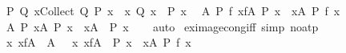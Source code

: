 \begin{isabellebody}
\ \ {\isachardoublequoteopen}{\isasymAnd}P\ Q{\isachardot}{\kern0pt}\ {\isacharparenleft}{\kern0pt}{\isasymexists}x{\isasymin}Collect\ Q{\isachardot}{\kern0pt}\ P\ x{\isacharparenright}{\kern0pt}\ {\isasymlongleftrightarrow}\ {\isacharparenleft}{\kern0pt}{\isasymexists}x{\isachardot}{\kern0pt}\ Q\ x\ {\isasymand}\ P\ x{\isacharparenright}{\kern0pt}{\isachardoublequoteclose}\isanewline
\ \ {\isachardoublequoteopen}{\isasymAnd}A\ P\ f{\isachardot}{\kern0pt}\ {\isacharparenleft}{\kern0pt}{\isasymexists}x{\isasymin}f{\isacharbackquote}{\kern0pt}A{\isachardot}{\kern0pt}\ P\ x{\isacharparenright}{\kern0pt}\ {\isasymlongleftrightarrow}\ {\isacharparenleft}{\kern0pt}{\isasymexists}x{\isasymin}A{\isachardot}{\kern0pt}\ P\ {\isacharparenleft}{\kern0pt}f\ x{\isacharparenright}{\kern0pt}{\isacharparenright}{\kern0pt}{\isachardoublequoteclose}\isanewline
\ \ {\isachardoublequoteopen}{\isasymAnd}A\ P{\isachardot}{\kern0pt}\ {\isacharparenleft}{\kern0pt}{\isasymnot}{\isacharparenleft}{\kern0pt}{\isasymexists}x{\isasymin}A{\isachardot}{\kern0pt}\ P\ x{\isacharparenright}{\kern0pt}{\isacharparenright}{\kern0pt}\ {\isasymlongleftrightarrow}\ {\isacharparenleft}{\kern0pt}{\isasymforall}x{\isasymin}A{\isachardot}{\kern0pt}\ {\isasymnot}\ P\ x{\isacharparenright}{\kern0pt}{\isachardoublequoteclose}\isanewline
%
\isadelimproof
\ \ %
\endisadelimproof
%
\isatagproof
{}\isamarkupfalse%
\ auto%
\endisatagproof
{\isafoldproof}%
%
\isadelimproof
\isanewline
%
\endisadelimproof
\isanewline
{}\isamarkupfalse%
\ ex{\isacharunderscore}{\kern0pt}image{\isacharunderscore}{\kern0pt}cong{\isacharunderscore}{\kern0pt}iff\ {\isacharbrackleft}{\kern0pt}simp{\isacharcomma}{\kern0pt}\ no{\isacharunderscore}{\kern0pt}atp{\isacharbrackright}{\kern0pt}{\isacharcolon}{\kern0pt}\isanewline
\ \ {\isachardoublequoteopen}{\isacharparenleft}{\kern0pt}{\isasymexists}x{\isachardot}{\kern0pt}\ x{\isasymin}f{\isacharbackquote}{\kern0pt}A{\isacharparenright}{\kern0pt}\ {\isasymlongleftrightarrow}\ A\ {\isasymnoteq}\ {\isacharbraceleft}{\kern0pt}{\isacharbraceright}{\kern0pt}{\isachardoublequoteclose}\ {\isachardoublequoteopen}{\isacharparenleft}{\kern0pt}{\isasymexists}x{\isachardot}{\kern0pt}\ x{\isasymin}f{\isacharbackquote}{\kern0pt}A\ {\isasymand}\ P\ x{\isacharparenright}{\kern0pt}\ {\isasymlongleftrightarrow}\ {\isacharparenleft}{\kern0pt}{\isasymexists}x{\isasymin}A{\isachardot}{\kern0pt}\ P\ {\isacharparenleft}{\kern0pt}f\ x{\isacharparenright}{\kern0pt}{\isacharparenright}{\kern0pt}{\isachardoublequoteclose}\isanewline
%
\isadelimproof
\ \ %
\endisadelimproof
%
\isatagproof

\end{isabellebody}
